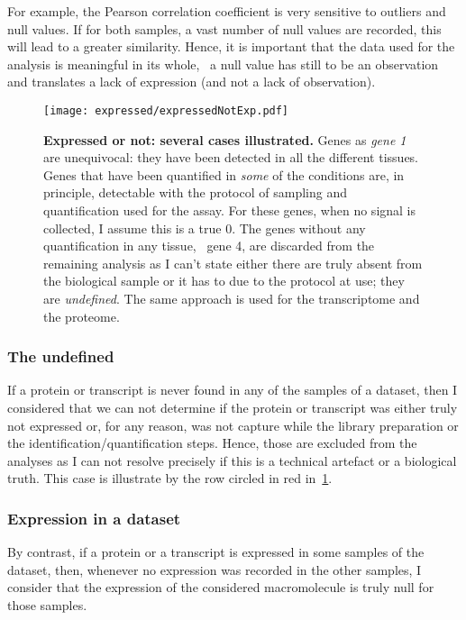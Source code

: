 For example, the Pearson correlation coefficient is very
sensitive to outliers and null values. If for both samples, a vast number of
null values are recorded, this will lead to a greater similarity.
Hence, it is important that the data used for the analysis is meaningful in
its whole, \ie\ a null value has still to be an observation and translates
a lack of expression (and not a lack of observation).

\begin{figure}[!htb]
    \texttt{[image: expressed/expressedNotExp.pdf]}\centering
      \caption[Expressed or not: several cases illustrated]
      {\label{fig:DefineExpression}\textbf{Expressed or not: several cases
      illustrated.}\smallbreak{} Genes as \emph{gene 1} are unequivocal: they have been
      detected in all the different tissues. Genes that have been quantified in
      \emph{some} of the conditions are, in principle, detectable with the
      protocol of sampling and quantification used for the assay.
      For these genes, when no signal is collected, I assume this is a true $0$.
      The genes without any quantification
      in any tissue, \eg\ gene 4, are discarded from the remaining analysis as
      I can't state
      either there are truly absent from the biological sample or it has to due
      to the protocol at use; they are \emph{undefined}. The same approach is used
      for the transcriptome and the proteome.}
\end{figure}

\subsubsection{The undefined}%
\label{subsec:ExpressedOrNot-undefined}
If a protein or transcript is never found in any of the samples of a dataset,
then I considered that we can not determine if the protein or transcript was
either truly not expressed or, for any reason, was not capture while the library
preparation or the identification/quantification steps. Hence, those are
excluded from the analyses as I can not resolve precisely if this is a
technical artefact or a biological truth. This case is illustrate by the row
circled in red in~\cref{fig:DefineExpression}.

\subsubsection{Expression in a dataset}
\label{subsec:ExpressedOrNot--expDataset}
By contrast, if a protein or a transcript is expressed in some samples of the
dataset, then, whenever no expression was recorded in the other
samples, I consider that the expression of the considered macromolecule is truly
null for those samples.

